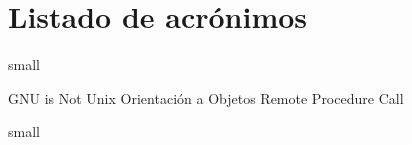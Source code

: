\chapter{Listado de acrónimos}

\small{small}
\begin{acronym}[XXXXXXXX]
       {\acs{GNU} is Not Unix}
        {Orientación a Objetos}
       {Remote Procedure Call}
\end{acronym}
\small{small}




